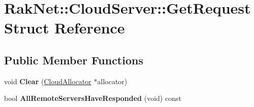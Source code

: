 \hypertarget{struct_rak_net_1_1_cloud_server_1_1_get_request}{\section{Rak\-Net\-:\-:Cloud\-Server\-:\-:Get\-Request Struct Reference}
\label{struct_rak_net_1_1_cloud_server_1_1_get_request}
}
\subsection*{Public Member Functions}
\begin{DoxyCompactItemize}
\item 
\hypertarget{struct_rak_net_1_1_cloud_server_1_1_get_request_ad4051eb0f24675b87a2722ea4c7dc4c3}{void {\bfseries Clear} (\hyperlink{class_rak_net_1_1_cloud_allocator}{Cloud\-Allocator} $\ast$allocator)}\label{struct_rak_net_1_1_cloud_server_1_1_get_request_ad4051eb0f24675b87a2722ea4c7dc4c3}

\item 
\hypertarget{struct_rak_net_1_1_cloud_server_1_1_get_request_a61455e54a13328ac9138adcba087ee47}{bool {\bfseries All\-Remote\-Servers\-Have\-Responded} (void) const }\label{struct_rak_net_1_1_cloud_server_1_1_get_request_a61455e54a13328ac9138adcba087ee47}

\end{DoxyCompactItemize}
